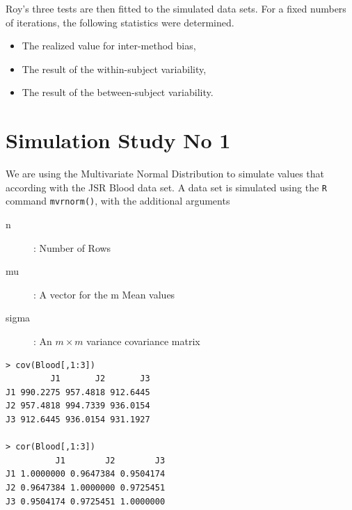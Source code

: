 Roy's three tests are then fitted to the simulated data sets. For a fixed numbers of iterations, the following statistics were determined.
\begin{itemize}
\item The realized value for inter-method bias,
\item The result of the within-subject variability,
\item The result of the between-subject variability.
\end{itemize}

\section{Simulation Study No 1}



We are using the Multivariate Normal Distribution to simulate values that according with the JSR Blood data set.
A data set is simulated using the \texttt{R} command \texttt{mvrnorm()}, with the additional arguments

\begin{description}
\item[n] : Number of Rows
\item[mu] : A vector for the m Mean values
\item[sigma] : An $m \times m$ variance covariance matrix
\end{description}

\begin{framed}
\begin{verbatim}
> cov(Blood[,1:3])
         J1       J2       J3
J1 990.2275 957.4818 912.6445
J2 957.4818 994.7339 936.0154
J3 912.6445 936.0154 931.1927

> cor(Blood[,1:3])
          J1        J2        J3
J1 1.0000000 0.9647384 0.9504174
J2 0.9647384 1.0000000 0.9725451
J3 0.9504174 0.9725451 1.0000000
\end{verbatim}
\end{framed}

%
%
%




